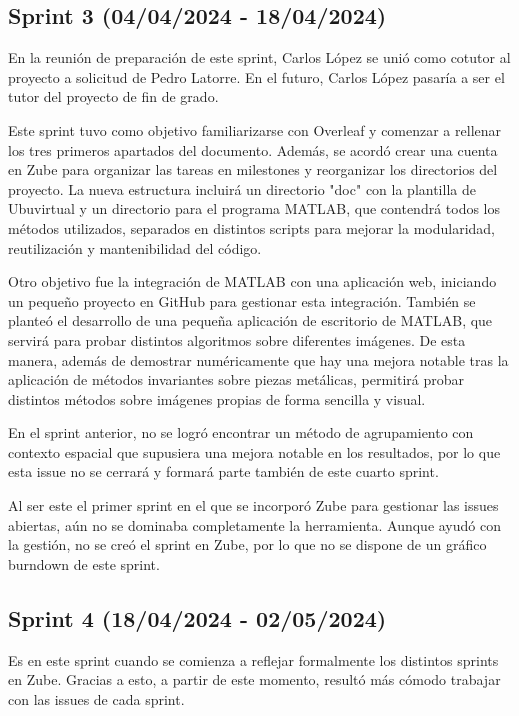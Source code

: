 \subsection{Sprint 3 (04/04/2024 - 18/04/2024)}\label{sprint-3}

En la reunión de preparación de este sprint, Carlos López se unió como cotutor al proyecto a solicitud de Pedro Latorre. En el futuro, Carlos López pasaría a ser el tutor del proyecto de fin de grado.

Este sprint tuvo como objetivo familiarizarse con Overleaf y comenzar a rellenar los tres primeros apartados del documento. Además, se acordó crear una cuenta en Zube para organizar las tareas en milestones y reorganizar los directorios del proyecto. La nueva estructura incluirá un directorio "doc" con la plantilla de Ubuvirtual y un directorio para el programa MATLAB, que contendrá todos los métodos utilizados, separados en distintos scripts para mejorar la modularidad, reutilización y mantenibilidad del código.

Otro objetivo fue la integración de MATLAB con una aplicación web, iniciando un pequeño proyecto en GitHub para gestionar esta integración. También se planteó el desarrollo de una pequeña aplicación de escritorio de MATLAB, que servirá para probar distintos algoritmos sobre diferentes imágenes. De esta manera, además de demostrar numéricamente que hay una mejora notable tras la aplicación de métodos invariantes sobre piezas metálicas, permitirá probar distintos métodos sobre imágenes propias de forma sencilla y visual.

En el sprint anterior, no se logró encontrar un método de agrupamiento con contexto espacial que supusiera una mejora notable en los resultados, por lo que esta issue no se cerrará y formará parte también de este cuarto sprint.

Al ser este el primer sprint en el que se incorporó Zube para gestionar las issues abiertas, aún no se dominaba completamente la herramienta. Aunque ayudó con la gestión, no se creó el sprint en Zube, por lo que no se dispone de un gráfico burndown de este sprint.

\subsection{Sprint 4 (18/04/2024 - 02/05/2024)}\label{sprint-4}

Es en este sprint cuando se comienza a reflejar formalmente los distintos sprints en Zube. Gracias a esto, a partir de este momento, resultó más cómodo trabajar con las issues de cada sprint.

